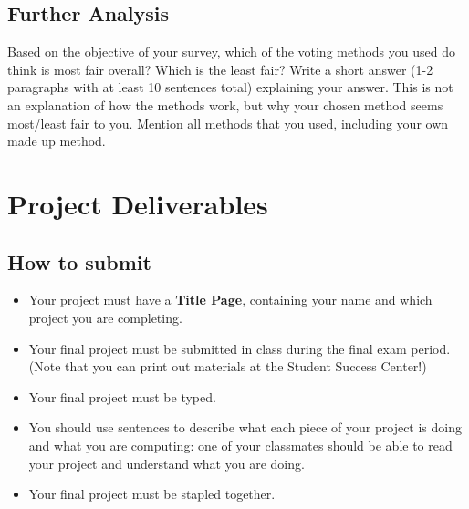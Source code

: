 \subsection*{Further Analysis}
Based on the objective of your survey, which of the voting
  methods you used do think is most fair overall? Which is the least
  fair? Write a short answer (1-2 paragraphs with at
  least 10 sentences total) explaining your answer. This is not an
  explanation of how the methods work, but why your chosen method seems
  most/least fair to you. Mention all methods that you used, including
  your own made up method.





\section{Project Deliverables}

\subsection*{How to submit}
\begin{itemize}

\item Your project must have a {\bf Title Page},  containing your name and which project you are completing.

\item Your final project must be submitted in class during the final exam period. (Note that you can print out materials at the Student Success Center!)

\item Your final project must be typed.

\item You should use sentences to describe what each piece of your project is doing and what you are computing: one of your classmates should be able to read your project and understand what you are doing.

\item Your final project must be stapled together.
\end{itemize}

